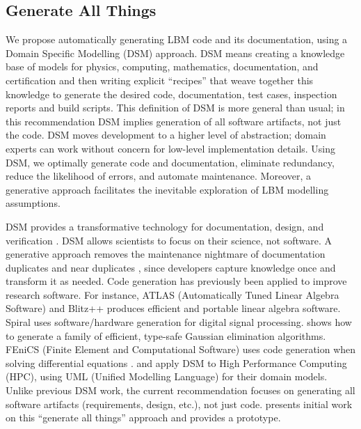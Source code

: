 \documentclass[final, 3p, times, authoryear]{elsarticle}
\begin{document}
\subsection{Generate All Things} \label{Sec_GenAllThings}

We propose automatically generating LBM code and its documentation, using a
Domain Specific Modelling (DSM) approach. DSM means creating a knowledge base of
models for physics, computing, mathematics, documentation, and certification and
then writing explicit ``recipes'' that weave together this knowledge to generate
the desired code, documentation, test cases, inspection reports and build
scripts. This definition of DSM is more general than usual; in this
recommendation DSM implies generation of all software artifacts, not just the
code. DSM moves development to a higher level of abstraction; domain experts can
work without concern for low-level implementation details. Using DSM, we
optimally generate code and documentation, eliminate redundancy, reduce the
likelihood of errors, and automate maintenance. Moreover, a generative approach
facilitates the inevitable exploration of LBM modelling assumptions.

DSM provides a transformative technology for documentation, design, and
verification \citep{JohansonAndHasselbring2018, Smith2018}. DSM allows
scientists to focus on their science, not software.  A generative approach
removes the maintenance nightmare of documentation duplicates and near
duplicates \citep{LucivEtAl2018}, since developers capture knowledge once and
transform it as needed.  Code generation has previously been applied to improve
research software.  For instance, ATLAS (Automatically Tuned Linear Algebra
Software) \citep{WhaleyEtAl2001} and Blitz++ \citep{Veldhuizen1998} produces
efficient and portable linear algebra software.  Spiral \citep{Pueschel2001}
uses software/hardware generation for digital signal processing.
\citet{Carette2008} shows how to generate a family of efficient, type-safe
Gaussian elimination algorithms.  FEniCS (Finite Element and Computational
Software) uses code generation when solving differential equations
\citep{LoggEtAl2012}. \citet{OberEtAl2018} and \citet{MatkerimEtAl2013} apply
DSM to High Performance Computing (HPC), using UML (Unified Modelling Language)
for their domain models. Unlike previous DSM work, the current recommendation
focuses on generating all software artifacts (requirements, design, etc.), not
just code.  \citet{SzymczakEtAl2016} presents initial work on this ``generate
all things'' approach and \citep{CaretteEtAl2021-Drasil} provides a prototype.
\end{document}
